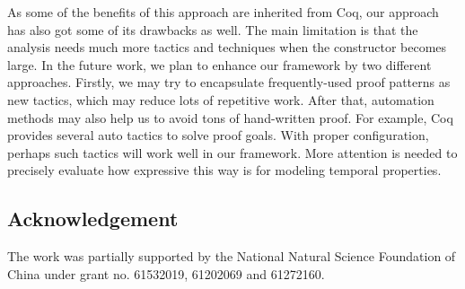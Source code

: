\documentclass[3p,times]{elsarticle}
\begin{document}
As some of the benefits of this approach are inherited from Coq, our approach has also got some of its drawbacks as well.
The main limitation is that the analysis needs much more tactics and techniques when the constructor becomes large.
In the future work, we plan to enhance our framework by two different approaches. Firstly, we may try to encapsulate
frequently-used proof patterns as new tactics, which may reduce lots of repetitive work. After that, automation methods
may also help us to avoid tons of hand-written proof. For example, Coq provides several auto tactics to solve proof
goals. With proper configuration, perhaps such tactics will work well in our framework. More attention is needed to precisely
evaluate how expressive this way is for modeling temporal properties.

\subsection*{Acknowledgement}
\noindent The work was partially supported by the National Natural Science Foundation of China under grant no. 61532019, 61202069 and 61272160.



\end{document}
